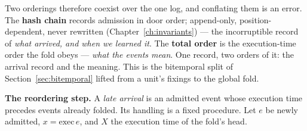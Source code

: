 \documentclass[11pt,a4paper]{article}
\begin{document}
Two orderings therefore coexist over the one log, and conflating them is an error. The
\textbf{hash chain} records admission in door order; append-only, position-dependent, never
rewritten (Chapter~\ref{ch:invariants}) --- the incorruptible record of \emph{what arrived,
and when we learned it}. The \textbf{total order} is the execution-time order the fold obeys
--- \emph{what the events mean}. One record, two orders of it: the arrival record and the
meaning. This is the bitemporal split of Section~\ref{sec:bitemporal} lifted from a unit's
fixings to the global fold.

\medskip\noindent\textbf{The reordering step.} A \emph{late arrival} is an admitted event
whose execution time precedes events already folded. Its handling is a fixed procedure. Let
$e$ be newly admitted, $x=\mathrm{exec}\,e$, and $X$ the execution time of the fold's head.
\end{document}
